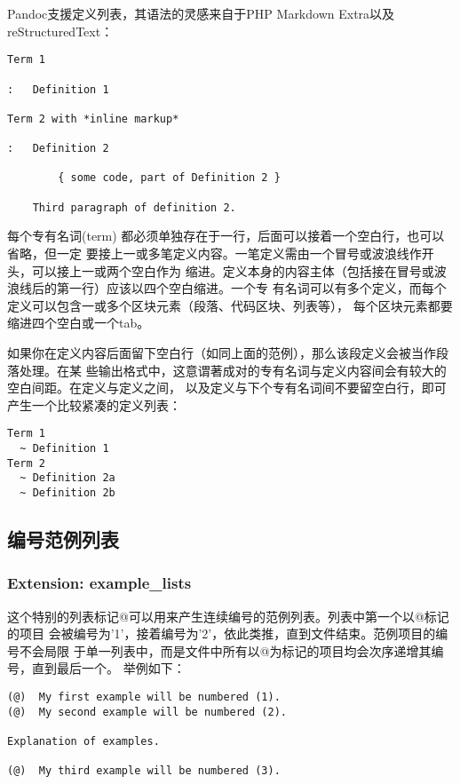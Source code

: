 \documentclass[fancyhdr,bookmark]{ctexbook}
\begin{document}
Pandoc支援定义列表，其语法的灵感来自于PHP Markdown
Extra以及reStructuredText：

\begin{lstlisting}
Term 1

:   Definition 1

Term 2 with *inline markup*

:   Definition 2

        { some code, part of Definition 2 }

    Third paragraph of definition 2.
\end{lstlisting}

每个专有名词(term)
都必须单独存在于一行，后面可以接着一个空白行，也可以省略，但一定
要接上一或多笔定义内容。一笔定义需由一个冒号或波浪线作开头，可以接上一或两个空白作为
缩进。定义本身的内容主体（包括接在冒号或波浪线后的第一行）应该以四个空白缩进。一个专
有名词可以有多个定义，而每个定义可以包含一或多个区块元素（段落、代码区块、列表等），
每个区块元素都要缩进四个空白或一个tab。

如果你在定义内容后面留下空白行（如同上面的范例），那么该段定义会被当作段落处理。在某
些输出格式中，这意谓著成对的专有名词与定义内容间会有较大的空白间距。在定义与定义之间，
以及定义与下个专有名词间不要留空白行，即可产生一个比较紧凑的定义列表：

\begin{lstlisting}
Term 1
  ~ Definition 1
Term 2
  ~ Definition 2a
  ~ Definition 2b
\end{lstlisting}

\subsection{编号范例列表}\label{ux7f16ux53f7ux8303ux4f8bux5217ux8868}

\subsubsection{Extension: example\_lists}\label{extension-example_lists}

这个特别的列表标记@可以用来产生连续编号的范例列表。列表中第一个以@标记的项目
会被编号为'1'，接着编号为'2'，依此类推，直到文件结束。范例项目的编号不会局限
于单一列表中，而是文件中所有以@为标记的项目均会次序递增其编号，直到最后一个。
举例如下：

\begin{lstlisting}
(@)  My first example will be numbered (1).
(@)  My second example will be numbered (2).

Explanation of examples.

(@)  My third example will be numbered (3).
\end{lstlisting}
\end{document}
